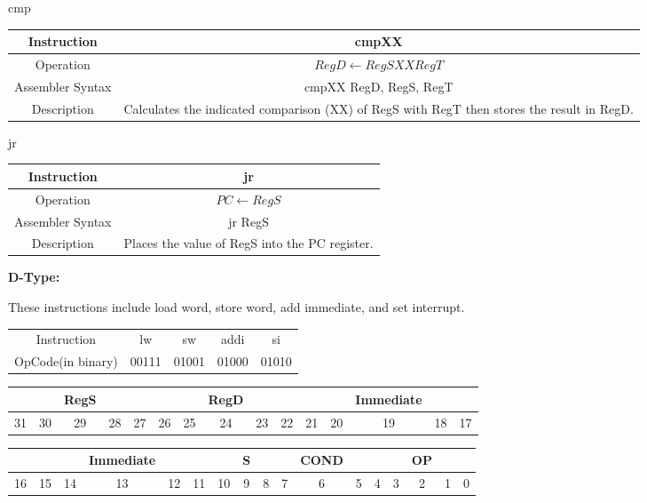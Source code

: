 \documentclass[]{article}
\begin{document}
	cmp\\
	\begin{tabularx}{\textwidth}{c|c}\hline
		Instruction & cmpXX\\\hline
		Operation & $RegD \leftarrow RegS XX RegT$\\\hline
		Assembler Syntax & cmpXX RegD, RegS, RegT\\\hline
		Description & Calculates the indicated comparison (XX) of RegS with RegT then stores the result in RegD.\\\hline
	\end{tabularx}\vspace{1.5cm}

	jr\\
	\begin{tabularx}{\textwidth}{c|c}\hline
		Instruction & jr\\\hline
		Operation & $PC \leftarrow RegS$\\\hline
		Assembler Syntax & jr RegS\\\hline
		Description & Places the value of RegS into the PC register.\\\hline
	\end{tabularx}\vspace{1.5cm}
\pagebreak



\pagebreak

{\Large
	\textbf{
		D-Type:
	}
}

\noindent These instructions include load word, store word, add immediate, and set interrupt.

\begin{center}
	\begin{tabular}{|c|c|c|c|c|}\cline{1-5}
	Instruction & lw & sw & addi & si\\\cline{1-5}\hfill
	OpCode(in binary) & 00111 & 01001 & 01000 & 01010 \\\cline{1-5}
	\end{tabular}\vspace{1.5cm}
\end{center}
\begin{tabular}{|ccccc|ccccc|ccccc|}\hline
  &  & RegS &  &  &  &  & RegD &  &  &  &  & Immediate &  &\\\hline
31&30&29&28&27&26&25&24&23&22&21&20&19&18&17\\\hline
\end{tabular}

\begin{tabular}{|ccccccc|c|cccc|ccccc|}\hline
	&  & & Immediate & &  & & S & & & COND & & & & OP & & \\\hline
16&15&14&13&12&11&10&9&8&7&6&5&4&3&2&1&0\\\hline
\end{tabular}
\vspace{5mm}
\end{document}
